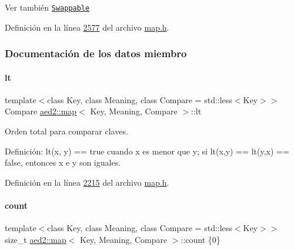 \begin{DoxySeeAlso}{Ver también}
\href{http://en.cppreference.com/w/cpp/concept/Swappable}{\tt Swappable} 
\end{DoxySeeAlso}


Definición en la línea \hyperlink{map_8h_source_l02577}{2577} del archivo \hyperlink{map_8h_source}{map.\+h}.



\subsubsection{Documentación de los datos miembro}
\mbox{\label{classaed2_1_1map_a0e5be36fae0693e4665bd2a615e7550a_a0e5be36fae0693e4665bd2a615e7550a}} 
\paragraph{\texorpdfstring{lt}{lt}}
{\footnotesize\ttfamily template$<$class Key, class Meaning, class Compare = std\+::less$<$\+Key$>$$>$ \\
Compare \hyperlink{classaed2_1_1map}{aed2\+::map}$<$ Key, Meaning, Compare $>$\+::lt\hspace{0.3cm}{\ttfamily [private]}}



Orden total para comparar claves. 

Definición\+: lt(x, y) == true cuando x es menor que y; si lt(x,y) == lt(y,x) == false, entonces x e y son iguales. 

Definición en la línea \hyperlink{map_8h_source_l02215}{2215} del archivo \hyperlink{map_8h_source}{map.\+h}.

\mbox{\label{classaed2_1_1map_a44236c4f16cdc20a10759862b198bde4_a44236c4f16cdc20a10759862b198bde4}} 
\paragraph{\texorpdfstring{count}{count}}
{\footnotesize\ttfamily template$<$class Key, class Meaning, class Compare = std\+::less$<$\+Key$>$$>$ \\
size\+\_\+t \hyperlink{classaed2_1_1map}{aed2\+::map}$<$ Key, Meaning, Compare $>$\+::count \{0\}\hspace{0.3cm}{\ttfamily [private]}}




